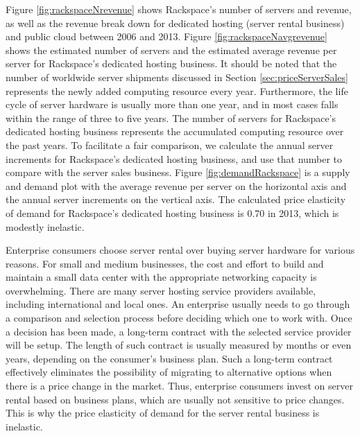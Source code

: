 \documentclass[10pt,journal,cspaper,compsoc]{IEEEtran}
\begin{document}
Figure \ref{fig:rackspaceNrevenue} shows Rackspace's number of servers and revenue, as well as the revenue break down for dedicated hosting (server rental business) and public cloud between 2006 and 2013. Figure \ref{fig:rackspaceNavgrevenue} shows the estimated number of servers and the estimated average revenue per server for Rackspace's dedicated hosting business. It should be noted that the number of worldwide server shipments discussed in Section \ref{sec:priceServerSales} represents the newly added computing resource every year. Furthermore, the life cycle of server hardware is usually more than one year, and in most cases falls within the range of three to five years. The number of servers for Rackspace's dedicated hosting business represents the accumulated computing resource over the past years. To facilitate a fair comparison, we calculate the annual server increments for Rackspace's dedicated hosting business, and use that number to compare with the server sales business. Figure \ref{fig:demandRackspace} is a supply and demand plot with the average revenue per server on the horizontal axis and the annual server increments on the vertical axis. The calculated price elasticity of demand for Rackspace's dedicated hosting business is 0.70 in 2013, which is modestly inelastic.

Enterprise consumers choose server rental over buying server hardware for various reasons. For small and medium businesses, the cost and effort to build and maintain a small data center with the appropriate networking capacity is overwhelming. There are many server hosting service providers available, including international and local ones. An enterprise usually needs to go through a comparison and selection process before deciding which one to work with. Once a decision has been made, a long-term contract with the selected service provider will be setup. The length of such contract is usually measured by months or even years, depending on the consumer's business plan. Such a long-term contract effectively eliminates the possibility of migrating to alternative options when there is a price change in the market. Thus, enterprise consumers invest on server rental based on business plans, which are usually not sensitive to price changes. This is why the price elasticity of demand for the server rental business is inelastic. 
\end{document}
